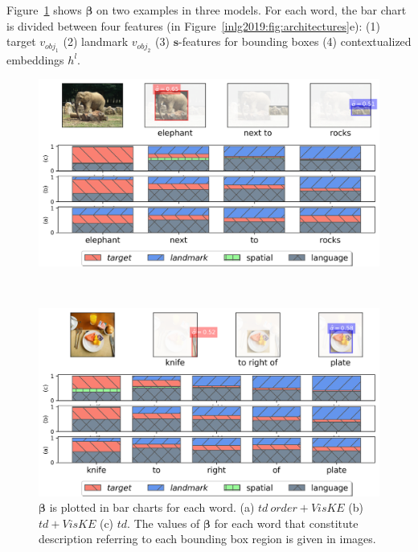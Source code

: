 Figure~\ref{inlg2019:fig:examples} shows $\bm{\beta}$ on two examples in three models.
For each word, the bar chart is divided between four features (in Figure~\ref{inlg2019:fig:architectures}e): (1) target $v_{obj_1}$ (2) landmark $v_{obj_2}$ (3) $\bm{s}$-features for bounding boxes (4) contextualized embeddings $h^l$.
\begin{figure}[ht!]
	\centering
	\begin{minipage}{0.75\linewidth}
		\centering
		\includegraphics[width=\columnwidth]{studies/inlg2019/figures/results/examples/mix/elephant_next_to_rocks.png}
	\end{minipage}\\
	\begin{minipage}{0.75\linewidth}
	\centering
	\includegraphics[width=\columnwidth]{studies/inlg2019/figures/results/examples/mix/knife_to_right_of_plate.png}
	\end{minipage}%
	\caption{$\bm{\beta}$ is plotted in bar charts for each word.
		(a) $td~order+VisKE$
		(b) $td+VisKE$
		(c) $td$.
		The values of $\bm{\beta}$ for each word that constitute description referring to each bounding box region is given in images.
	}
	\label{inlg2019:fig:examples}
\end{figure}


